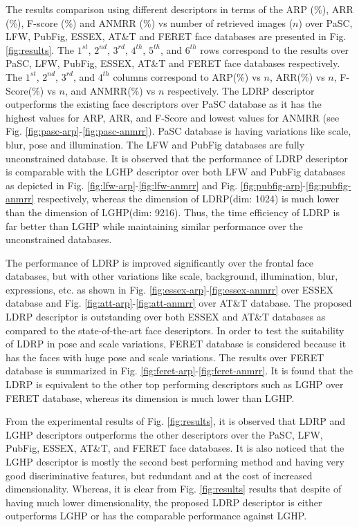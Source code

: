 \documentclass[a4paper]{article}
\begin{document}
The results comparison using different descriptors in terms of the ARP (\%), ARR (\%), F-score (\%) and ANMRR (\%) vs number of retrieved images ($n$) over PaSC, LFW, PubFig, ESSEX, AT\&T and FERET face databases are presented in Fig. \ref{fig:results}. The $1^{st}$, $2^{nd}$, ${3^{rd}}$, ${4^{th}}$, ${5^{th}}$, and ${6^{th}}$ rows correspond to the results over PaSC, LFW, PubFig, ESSEX, AT\&T and FERET face databases respectively. The $1^{st}$, $2^{nd}$, ${3^{rd}}$, and ${4^{th}}$ columns correspond to ARP(\%) vs $n$, ARR(\%) vs $n$, F-Score(\%) vs $n$, and ANMRR(\%) vs $n$ respectively. 
The LDRP descriptor outperforms the existing face descriptors over PaSC database as it has the highest values for ARP, ARR, and F-Score and lowest values for ANMRR (see Fig. \ref{fig:pasc-arp}-\ref{fig:pasc-anmrr}). PaSC database is having variations like scale, blur, pose and illumination. The LFW and PubFig databases are fully unconstrained database. It is observed that the performance of LDRP descriptor is comparable with the LGHP descriptor over both LFW and PubFig databases as depicted in Fig. \ref{fig:lfw-arp}-\ref{fig:lfw-anmrr} and Fig. \ref{fig:pubfig-arp}-\ref{fig:pubfig-anmrr} respectively, whereas the dimension of LDRP(dim: 1024) is much lower than the dimension of LGHP(dim: 9216). Thus, the time efficiency of LDRP is far better than LGHP while maintaining similar performance over the unconstrained databases. 

The performance of LDRP is improved significantly over the frontal face databases, but with other variations like scale, background, illumination, blur, expressions, etc. as shown in Fig. \ref{fig:essex-arp}-\ref{fig:essex-anmrr} over ESSEX database and Fig. \ref{fig:att-arp}-\ref{fig:att-anmrr} over AT\&T database. The proposed LDRP descriptor is outstanding over both ESSEX and AT\&T databases as compared to the state-of-the-art face descriptors. In order to test the suitability of LDRP in pose and scale variations, FERET database is considered because it has the faces with huge pose and scale variations. The results over FERET database is summarized in Fig. \ref{fig:feret-arp}-\ref{fig:feret-anmrr}. It is found that the LDRP is equivalent to the other top performing descriptors such as LGHP over FERET database, whereas its dimension is much lower than LGHP. 

From the experimental results of Fig. \ref{fig:results}, it is observed that LDRP and LGHP descriptors outperforms the other descriptors over the PaSC, LFW, PubFig, ESSEX, AT\&T, and FERET face databases. It is also noticed that the LGHP descriptor is mostly the second best performing method and having very good discriminative features, but redundant and at the cost of increased dimensionality. Whereas, it is clear from Fig. \ref{fig:results} results that despite of having much lower dimensionality, the proposed LDRP descriptor is either outperforms LGHP or has the comparable performance against LGHP. 
\end{document}
